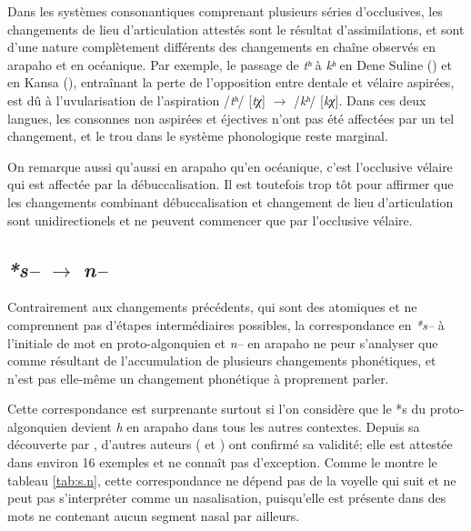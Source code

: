 \documentclass[twoside,a4paper,11pt]{article}
\newcommand{\ipa}[1]{{\phon\textit{#1}}}
\newcommand{\Σ}{\greek{Σ}}
\begin{document}
Dans les systèmes consonantiques comprenant plusieurs séries d'occlusives, les changements de lieu d'articulation attestés sont le résultat d'assimilations, et sont d'une nature complètement différents des changements en chaîne observés en arapaho et en océanique. Par exemple, le passage de \ipa{tʰ} à \ipa{kʰ} en Dene Suline (\citealt{haas68chipewyan}) et en Kansa (\citealt{csd2006}), entraînant la perte de l'opposition entre dentale et vélaire aspirées, est dû à l'uvularisation de l'aspiration /\ipa{tʰ}/ [\ipa{tχ}] $\rightarrow$ /\ipa{kʰ}/ [\ipa{kχ}]. Dans ces deux langues, les consonnes non aspirées et éjectives n'ont pas été affectées par un tel changement, et le trou dans le système phonologique reste marginal.
 
On remarque aussi qu'aussi en arapaho qu'en océanique, c'est l'occlusive vélaire qui est affectée par la débuccalisation. Il est toutefois trop tôt pour affirmer que les changements combinant débuccalisation et changement de lieu d'articulation sont unidirectionels et ne peuvent commencer que par l'occlusive vélaire.


\subsection{\ipa{*s--} $\rightarrow$ \ipa{n--} }
Contrairement aux changements   précédents, qui sont des atomiques et ne comprennent pas d'étapes intermédiaires possibles, la correspondance en \ipa{*s--} à l'initiale de mot en proto-algonquien et \ipa{n--} en arapaho ne peur s'analyser que comme résultant de l'accumulation de plusieurs changements phonétiques, et n'est pas elle-même un changement phonétique à proprement parler.

Cette correspondance est surprenante surtout si l'on considère que le *s du proto-algonquien devient \ipa{h} en arapaho dans tous les autres contextes. Depuis sa découverte par \citet{goddard74arapaho}, d'autres auteurs (\citealt{pentland98} et \citealt{jacques13arapaho}) ont confirmé sa validité; elle est attestée dans environ 16 exemples  et ne connaît pas d'exception. Comme le montre le tableau \ref{tab:s.n}, cette correspondance ne dépend pas de la voyelle qui suit et ne peut pas s'interpréter comme un nasalisation, puisqu'elle est présente dans des mots ne contenant aucun segment nasal par ailleurs. 
\end{document}
